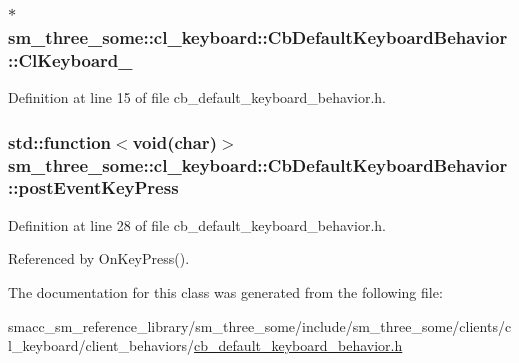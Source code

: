 \subsubsection[{\texorpdfstring{Cl\+Keyboard\+\_\+}{ClKeyboard_}}]{$\ast$ sm\+\_\+three\+\_\+some\+::cl\+\_\+keyboard\+::\+Cb\+Default\+Keyboard\+Behavior\+::\+Cl\+Keyboard\+\_\+}\hypertarget{classsm__three__some_1_1cl__keyboard_1_1CbDefaultKeyboardBehavior_a03196e84c3c68b1d20bbe29f9806260a}{}\label{classsm__three__some_1_1cl__keyboard_1_1CbDefaultKeyboardBehavior_a03196e84c3c68b1d20bbe29f9806260a}


Definition at line 15 of file cb\+\_\+default\+\_\+keyboard\+\_\+behavior.\+h.

\subsubsection[{\texorpdfstring{post\+Event\+Key\+Press}{postEventKeyPress}}]{\setlength{\rightskip}{0pt plus 5cm}std\+::function$<$void(char)$>$ sm\+\_\+three\+\_\+some\+::cl\+\_\+keyboard\+::\+Cb\+Default\+Keyboard\+Behavior\+::post\+Event\+Key\+Press}\hypertarget{classsm__three__some_1_1cl__keyboard_1_1CbDefaultKeyboardBehavior_a8d0fbc335dd7a4ee8b5d7f8e1c1be955}{}\label{classsm__three__some_1_1cl__keyboard_1_1CbDefaultKeyboardBehavior_a8d0fbc335dd7a4ee8b5d7f8e1c1be955}


Definition at line 28 of file cb\+\_\+default\+\_\+keyboard\+\_\+behavior.\+h.



Referenced by On\+Key\+Press().



The documentation for this class was generated from the following file\+:\begin{DoxyCompactItemize}
\item 
smacc\+\_\+sm\+\_\+reference\+\_\+library/sm\+\_\+three\+\_\+some/include/sm\+\_\+three\+\_\+some/clients/cl\+\_\+keyboard/client\+\_\+behaviors/\hyperlink{cb__default__keyboard__behavior_8h}{cb\+\_\+default\+\_\+keyboard\+\_\+behavior.\+h}\end{DoxyCompactItemize}
